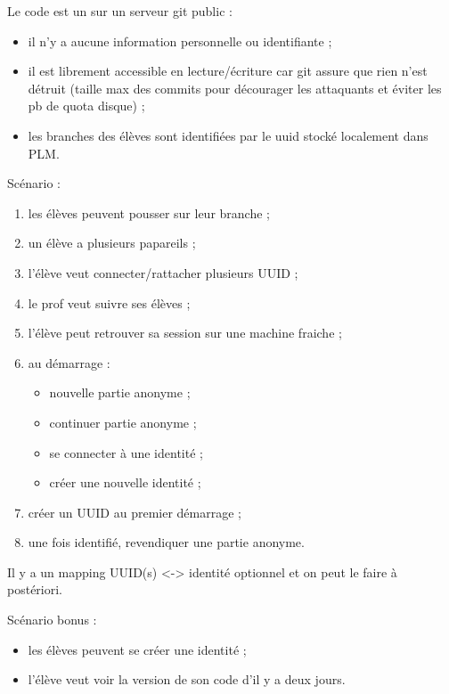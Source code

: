 \documentclass[12pt,a4paper]{article}
\begin{document}
%

Le code est un sur un serveur git public :
\begin{itemize}
\item il n'y a aucune information personnelle ou identifiante ;
\item il est librement accessible en lecture/écriture car git assure que rien n'est détruit (taille max des commits pour décourager les attaquants et éviter les pb de quota disque) ;
\item les branches des élèves sont identifiées par le uuid stocké localement dans PLM.
\end{itemize}

Scénario :
\begin{enumerate}
\item les élèves peuvent pousser sur leur branche ;
\item un élève a plusieurs papareils ;
\item l'élève veut connecter/rattacher plusieurs UUID ;
\item le prof veut suivre ses élèves ;
\item l'élève peut retrouver sa session sur une machine fraiche ;
\item au démarrage : 
	\begin{itemize}
	\item nouvelle partie anonyme ;
	\item continuer partie anonyme ;
	\item se connecter à une identité ;
	\item créer une nouvelle identité ;
	\end{itemize}
\item créer un UUID au premier démarrage ;
\item une fois identifié, revendiquer une partie anonyme.
\end{enumerate}

Il y a un mapping UUID(s) <-> identité optionnel et on peut le faire à postériori.

Scénario bonus :
\begin{itemize}
\item les élèves peuvent se créer une identité ;
\item l'élève veut voir la version de son code d'il y a deux jours.
\end{itemize}

\end{document}
